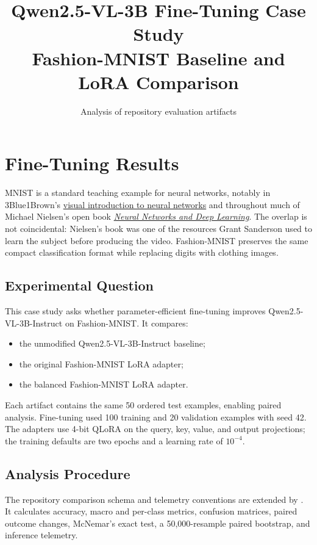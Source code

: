 \documentclass[11pt,a4paper]{report}
\title{\textbf{Qwen2.5-VL-3B Fine-Tuning Case Study}\\[8pt]
Fashion-MNIST Baseline and LoRA Comparison}
\author{Analysis of repository evaluation artifacts}
\date{}
\begin{document}
\maketitle
\clearpage
{}

\chapter{Fine-Tuning Results}

\noindent
MNIST is a standard teaching example for neural networks, notably in
3Blue1Brown's
\href{https://www.youtube.com/watch?v=aircAruvnKk}{visual introduction to neural
networks} and throughout much of Michael Nielsen's open book
\href{https://neuralnetworksanddeeplearning.com/}{\emph{Neural Networks and Deep
Learning}}. The overlap is not coincidental: Nielsen's book was one of the
resources Grant Sanderson used to learn the subject before producing the video.
Fashion-MNIST preserves the same compact classification format while replacing
digits with clothing images.

\section{Experimental Question}

This case study asks whether parameter-efficient fine-tuning improves
Qwen2.5-VL-3B-Instruct on Fashion-MNIST. It compares:

\begin{itemize}[leftmargin=*]
    \item the unmodified Qwen2.5-VL-3B-Instruct baseline;
    \item the original Fashion-MNIST LoRA adapter;
    \item the balanced Fashion-MNIST LoRA adapter.
\end{itemize}

Each artifact contains the same 50 ordered test examples, enabling paired
analysis. Fine-tuning used 100 training and 20 validation examples with seed
42. The adapters use 4-bit QLoRA on the query, key, value, and output
projections; the training defaults are two epochs and a learning rate of
\(10^{-4}\).

\section{Analysis Procedure}

The repository comparison schema and telemetry conventions are extended by
. It calculates accuracy,
macro and per-class metrics, confusion matrices, paired outcome changes,
McNemar's exact test, a 50,000-resample paired bootstrap, and inference
telemetry.
\end{document}
